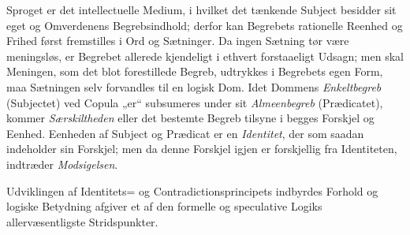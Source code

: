 \documentclass[12pt]{book}
\newcommand{\opage}[1]{\marginnote{\footnotesize\textit{[#1]}}}
\begin{document}
Sproget er det intellectuelle Medium, i hvilket det tænkende Subject besidder sit
eget og Omverdenens Begrebsindhold; derfor kan Begrebets rationelle Reenhed og
Frihed først fremstilles i Ord og Sætninger. Da ingen Sætning tør være
meningsløs, er Begrebet allerede kjendeligt i ethvert forstaaeligt Udsagn; men
skal Meningen, som det blot forestillede Begreb, udtrykkes i Begrebets egen Form,
maa Sætningen selv forvandles til en logisk Dom. Idet Dommens
\emph{Enkeltbegreb} (Subjectet) ved Copula „er“ subsumeres under sit
\emph{Almeenbegreb} (Prædicatet), kommer \emph{Særskiltheden} eller det bestemte
Begreb tilsyne i begges Forskjel og Eenhed. Eenheden af Subject og Prædicat er en
\emph{Identitet}, der som saadan indeholder sin Forskjel; men da denne Forskjel
igjen er forskjellig fra Identiteten, indtræder \emph{Modsigelsen}.

\opage{36} Udviklingen af Identitets= og Contradictionsprincipets indbyrdes Forhold og
logiske Betydning afgiver et af den formelle og speculative Logiks
allervæsentligste Stridspunkter.
\end{document}
